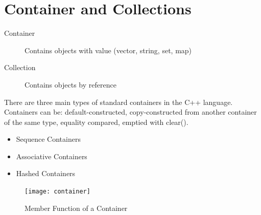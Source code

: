 \section{Container and Collections}
\begin{description}
  \item[Container] Contains objects with value (vector, string, set, map)
  \item[Collection] Contains objects by reference
\end{description}

There are three main types of standard containers in the C++ language. \\ Containers can be: default-constructed, copy-constructed from another container of the same type, equality compared, emptied with clear().
\begin{itemize}
	\itemsep -0.5em
	\item Sequence Containers
	\item Associative Containers
	\item Hashed Containers
\end{itemize}

\begin{figure}[h!]
  \centering
  \texttt{[image: container]}
  \caption{Member Function of a Container}
\end{figure}

